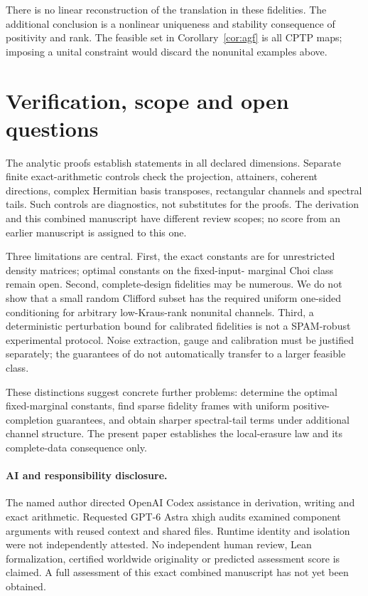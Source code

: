\documentclass[11pt,a4paper]{article}
\begin{document}
There is no linear reconstruction of the translation in these
fidelities. The additional conclusion is a nonlinear uniqueness and
stability consequence of positivity and rank. The feasible set in
Corollary~\ref{cor:agf} is all CPTP maps; imposing a unital constraint
would discard the nonunital examples above.

\section{Verification, scope and open questions}
The analytic proofs establish statements in all declared dimensions.
Separate finite exact-arithmetic controls check the projection,
attainers, coherent directions, complex Hermitian basis transposes,
rectangular channels and spectral tails. Such controls are diagnostics,
not substitutes for the proofs. The derivation and this combined
manuscript have different review scopes; no score from an earlier
manuscript is assigned to this one.

Three limitations are central. First, the exact constants are for
unrestricted density matrices; optimal constants on the fixed-input-
marginal Choi class remain open. Second, complete-design fidelities
may be numerous. We do not show that a small random Clifford subset
has the required uniform one-sided conditioning for arbitrary
low-Kraus-rank nonunital channels. Third, a deterministic perturbation
bound for calibrated fidelities is not a SPAM-robust experimental
protocol. Noise extraction, gauge and calibration must be justified
separately; the guarantees of \cite{kimmel,roth} do not automatically
transfer to a larger feasible class.

These distinctions suggest concrete further problems: determine the
optimal fixed-marginal constants, find sparse fidelity frames with
uniform positive-completion guarantees, and obtain sharper spectral-tail
terms under additional channel structure. The present paper establishes
the local-erasure law and its complete-data consequence only.

\paragraph{AI and responsibility disclosure.}
The named author directed OpenAI Codex assistance in derivation,
writing and exact arithmetic. Requested GPT-6 Astra xhigh audits
examined component arguments with reused context and shared files.
Runtime identity and isolation were not independently attested.
No independent human review, Lean formalization, certified worldwide
originality or predicted assessment score is claimed. A full assessment
of this exact combined manuscript has not yet been obtained.
\end{document}
